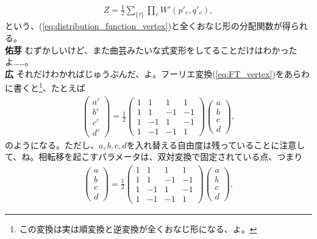 \documentclass[paper=b5j,fontsize=12Q,jafontsize=12Q,baselineskip=21Q]{jlreq}
\DeclareRobustCommand{\hiron}{\textbf{広 }}
\DeclareRobustCommand{\umen}{\textbf{佑芽 }}
\begin{document}
\begin{refsection}
\begin{align}
  Z=\frac12\sum_{\{\tau\}}\prod_vW'(p'_v,q'_v),
\end{align}
という、(\ref{eq:distribution_function_vertex})と全くおなじ形の分配関数が得られる。
\\\umen むずかしいけど、また曲芸みたいな式変形をしてることだけはわかったよ……。
\\\hiron それだけわかればじゅうぶんだ、よ。フーリエ変換(\ref{eq:FT_vertex})をあらわに書くと\footnote{この変換は実は順変換と逆変換が全くおなじ形になる、よ。}、たとえば
\begin{align}
  \begin{pmatrix}
    a' \\ b' \\ c' \\ d'
  \end{pmatrix}
  =\frac12
  \begin{pmatrix}
    1 & 1 & 1 & 1 \\
    1 & 1 & -1 & -1 \\
    1 & -1 & 1 & -1 \\
    1 & -1 & -1 & 1
  \end{pmatrix}
  \begin{pmatrix}
    a \\ b \\ c \\ d
  \end{pmatrix},
\end{align}
のようになる。ただし、$a,b,c,d$を入れ替える自由度は残っていることに注意して、ね。相転移を起こすパラメータは、双対変換で固定されている点、つまり
\begin{align}
  \begin{pmatrix}
    a \\ b \\ c \\ d
  \end{pmatrix}
  =\frac12
  \begin{pmatrix}
    1 & 1 & 1 & 1 \\
    1 & 1 & -1 & -1 \\
    1 & -1 & 1 & -1 \\
    1 & -1 & -1 & 1
  \end{pmatrix}
  \begin{pmatrix}
    a \\ b \\ c \\ d
  \end{pmatrix},
\end{align}

\end{refsection}
\end{document}
